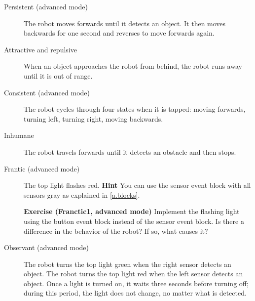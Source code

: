 \begin{description}
\item[Persistent (advanced mode)] The robot moves forwards until it detects
an object. It then moves backwards for one second and reverses to move
forwards again.

\item[Attractive and repulsive] When an object approaches the robot from
behind, the robot runs away until it is out of range.

\item[Consistent (advanced mode)] The robot cycles through four states when
it is tapped: moving forwards, turning left, turning right, moving
backwards.

\item[Inhumane] The robot travels forwards until it detects an obstacle
and then stops.

\item[Frantic (advanced mode)] The top light flashes red. \textbf{Hint}
You can use the sensor event block with all sensors gray as explained in
\cref{a.blocks}.

\textbf{Exercise (Franctic1, advanced mode)} Implement the flashing light using
the button event block instead of the sensor event block. Is there a
difference in the behavior of the robot? If so, what causes it?

\item[Observant (advanced mode)] The robot turns the top light green when the
right sensor detects an object. The robot turns the top light red when the
left sensor detects an object. Once a light is turned on, it waits three
seconds before turning off; during this period, the light does not change,
no matter what is detected.

\end{description}
